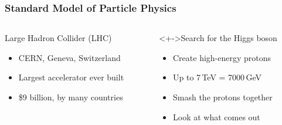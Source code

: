 \begin{frame}[t]
 \frametitle{Standard Model of Particle Physics}
 \begin{columns}[T]
  \begin{column}{0.5\textwidth}
   \begin{block}{Large Hadron Collider (LHC)\footnotemark}
    \begin{itemize}
     \item CERN, Geneva, Switzerland
     \item Largest accelerator ever built
     \item \$9 billion, by many countries
    \end{itemize}
   \end{block}
   \begin{center}
   \end{center}
  \end{column}
  \begin{column}{0.5\textwidth}
   \begin{block}<+->{Search for the Higgs boson}
    \begin{itemize}
     \item Create high-energy protons
     \item Up to 7\,TeV = 7000\,GeV
     \item Smash the protons together
     \item Look at what comes out
    \end{itemize}
   \end{block}
   \begin{center}
   \end{center}
  \end{column}
 \end{columns}
\end{frame}
